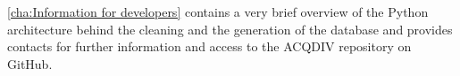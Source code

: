\documentclass[a4paper, 11pt]{book}
\begin{document}
\autoref{cha:Information for developers} contains a very brief overview of the Python architecture behind the cleaning and the generation of the database and provides contacts for further information and access to the ACQDIV repository on GitHub. 


%
%
%
%
%
%
\end{document}

